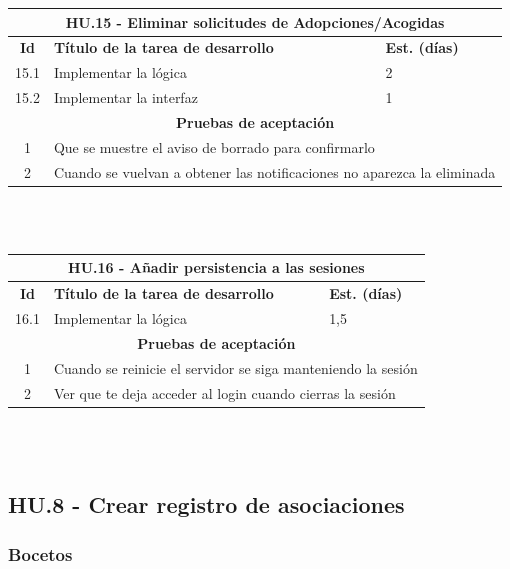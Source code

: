 \begin{tabular}{|c|p{9.5cm}|p{1cm}|}
	\hline
	\multicolumn{3}{|c|}{\textbf{HU.15 - Eliminar solicitudes de Adopciones/Acogidas}} \\
	\hline
	\textbf{Id} & \textbf{Título de la tarea de desarrollo} & \textbf{Est. (días)} \\
	\hline
	15.1 & Implementar la lógica & 2 \\ \hline
	15.2 & Implementar la interfaz & 1 \\ \hline 
	\multicolumn{3}{|c|}{\textbf{Pruebas de aceptación}} \\ \hline
	1 & \multicolumn{2}{|p{12cm}|}{Que se muestre el aviso de borrado para confirmarlo} \\ \hline
	2 & \multicolumn{2}{|p{12cm}|}{Cuando se vuelvan a obtener las notificaciones no aparezca la eliminada} \\ \hline
	
\end{tabular} \\ \\

\begin{tabular}{|c|p{9.5cm}|p{1cm}|}
	\hline
	\multicolumn{3}{|c|}{\textbf{HU.16 - Añadir persistencia a las sesiones}} \\
	\hline
	\textbf{Id} & \textbf{Título de la tarea de desarrollo} & \textbf{Est. (días)} \\
	\hline
	16.1 &  Implementar la lógica & 1,5 \\ \hline
	\multicolumn{3}{|c|}{\textbf{Pruebas de aceptación}} \\ \hline
	1 & \multicolumn{2}{|p{12cm}|}{Cuando se reinicie el servidor se siga manteniendo la sesión} \\ \hline
	2 & \multicolumn{2}{|p{12cm}|}{Ver que te deja acceder al login cuando cierras la sesión} \\ \hline
	
\end{tabular} \\ \\

\subsection{HU.8 - Crear registro de asociaciones}

\subsubsection{Bocetos}

